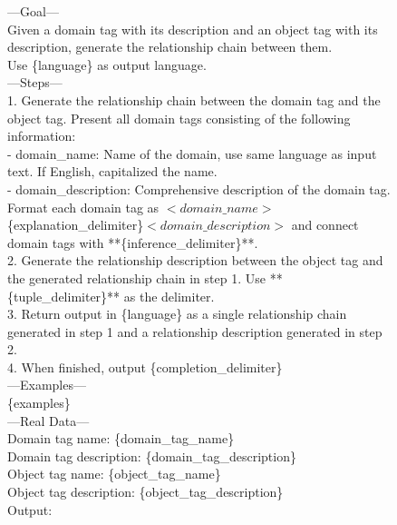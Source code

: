 \documentclass[11pt]{article}
\begin{document}
\begin{figure}[h]
\centering
\small
\begin{tcolorbox}[title=Prompt of domain tag chain organization, colframe=gray, colback=white]
    ---Goal--- \\
    Given a domain tag with its description and an object tag with its description, generate the relationship chain between them. \\
    Use \{language\} as output language. \\
    ---Steps--- \\
    1. Generate the relationship chain between the domain tag and the object tag. Present all domain tags consisting of the following information: \\
    - domain\_name: Name of the domain, use same language as input text. If English, capitalized the name. \\
    - domain\_description: Comprehensive description of the domain tag. \\
    Format each domain tag as $<domain\_name>$\{explanation\_delimiter\}$<domain\_description>$ and connect domain tags with **\{inference\_delimiter\}**. \\
    2. Generate the relationship description between the object tag and the generated relationship chain in step 1. Use **\{tuple\_delimiter\}** as the delimiter. \\
    3. Return output in \{language\} as a single relationship chain generated in step 1 and a relationship description generated in step 2. \\
    4. When finished, output \{completion\_delimiter\} \\
    ---Examples--- \\
    \{examples\} \\
    ---Real Data--- \\
    Domain tag name: \{domain\_tag\_name\} \\
    Domain tag description: \{domain\_tag\_description\} \\
    Object tag name: \{object\_tag\_name\} \\
    Object tag description: \{object\_tag\_description\} \\
    Output:
\end{tcolorbox}
\end{figure}
\end{document}
